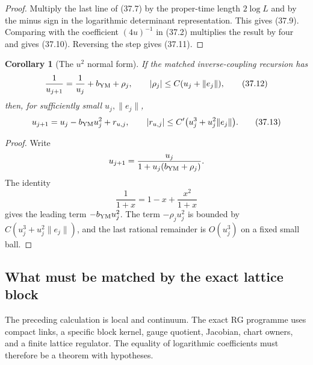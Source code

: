 \documentclass[11pt,oneside]{book}
\newtheorem{corollary}[theorem]{Corollary}
\theoremstyle{definition}
\theoremstyle{remark}
\begin{document}
\begin{proof}
Multiply the last line of (37.7) by the proper-time length
\(2\log L\) and by the minus sign in the logarithmic determinant
representation.  This gives (37.9).  Comparing with the coefficient
\((4u)^{-1}\) in (37.2) multiplies the result by four and gives
(37.10).  Reversing the step gives (37.11).
\end{proof}

\begin{corollary}[The \(u^2\) normal form]
\label{cor:e8v37-u-normal}
If the matched inverse-coupling recursion has
\[
 \frac1{u_{j+1}}
 =
 \frac1{u_j}+b_{\rm YM}+\rho_j,\qquad
 |\rho_j|\leq C(u_j+\|e_j\|),                                   \tag{37.12}
\]
then, for sufficiently small \(u_j,\|e_j\|\),
\[
 u_{j+1}
 =
 u_j-b_{\rm YM}u_j^2+r_{u,j},\qquad
 |r_{u,j}|
 \leq
 C'\bigl(u_j^3+u_j^2\|e_j\|\bigr).                              \tag{37.13}
\]
\end{corollary}

\begin{proof}
Write
\[
 u_{j+1}
 =
 \frac{u_j}{1+u_j(b_{\rm YM}+\rho_j)}.
\]
The identity
\[
 \frac1{1+x}=1-x+\frac{x^2}{1+x}
\]
gives the leading term \(-b_{\rm YM}u_j^2\).
The term \(-\rho_ju_j^2\) is bounded by
\(C(u_j^3+u_j^2\|e_j\|)\), and the last rational remainder is
\(O(u_j^3)\) on a fixed small ball.
\end{proof}

\subsection{What must be matched by the exact lattice block}

The preceding calculation is local and continuum.  The exact RG
programme uses compact links, a specific block kernel, gauge
quotient, Jacobian, chart owners, and a finite lattice regulator.
The equality of logarithmic coefficients must therefore be a
theorem with hypotheses.
\end{document}
